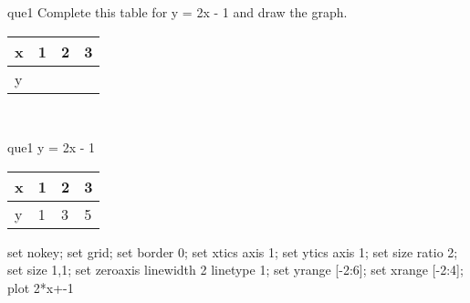 \documentclass[13.5pt, varwidth=true]{beamer}
\begin{document}
\begin{frame}[shrink=19,fragile]
	\begin{beamercolorbox}[rounded=true, left, shadow=true,wd=14.8cm]{que1}
		 Complete this table for y = 2x - 1 and draw the graph. \\[0.3cm] \renewcommand{\arraystretch}{1.2}\begin{tabular}{|C|C|C|C|} \hline x & 1 & 2 & 3 \\ \hline y & & & \\ \hline \end{tabular}\\[0.3cm]
	\end{beamercolorbox}
\end{frame}
\begin{frame}[shrink=19,fragile]
	\begin{beamercolorbox}[rounded=true, left, shadow=true,wd=14.8cm]{que1}
		y = 2x - 1\renewcommand{\arraystretch}{1.2}\begin{tabular}{|C|C|C|C|} \hline x & 1 & 2 & 3 \\ \hline y & 1 & 3 & 5\\ \hline \end{tabular}\begin{gnuplot}[terminal=pdf] set nokey; set grid; set border 0; set xtics axis 1; set ytics axis 1; set size ratio 2; set size 1,1; set zeroaxis linewidth 2 linetype 1; set yrange [-2:6]; set xrange [-2:4]; plot 2*x+-1 \end{gnuplot}
	\end{beamercolorbox}
\end{frame}
\end{document}
